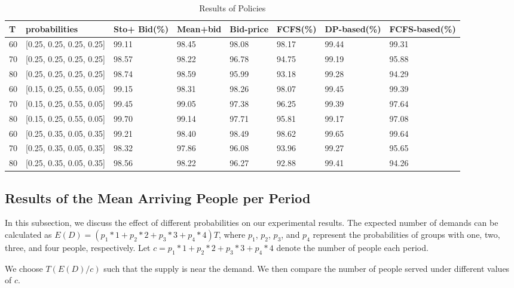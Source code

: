 \begin{table}[ht]
  \centering
  \caption{Results of Policies}
  \begin{tabular}{|l|l|l|l|l|l|l|l|}
  \hline
   T & probabilities &  Sto+ Bid(\%) & Mean+bid & Bid-price & FCFS(\%) & DP-based(\%) & FCFS-based(\%) \\
  \hline
   60  & [0.25, 0.25, 0.25, 0.25]  & 99.11 & 98.45 & 98.08 & 98.17 & 99.44 & 99.31 \\
   70  & [0.25, 0.25, 0.25, 0.25]  & 98.57 & 98.22 & 96.78 & 94.75 & 99.19 & 95.88 \\
   80  & [0.25, 0.25, 0.25, 0.25]  & 98.74 & 98.59 & 95.99 & 93.18 & 99.28 & 94.29 \\
   \hline
   60  & [0.15, 0.25, 0.55, 0.05]  & 99.15 & 98.31 & 98.26 & 98.07 & 99.45 & 99.39 \\
   70  & [0.15, 0.25, 0.55, 0.05]  & 99.45 & 99.05 & 97.38 & 96.25 & 99.39 & 97.64 \\
   80  & [0.15, 0.25, 0.55, 0.05]  & 99.70 & 99.14 & 97.71 & 95.81 & 99.17 & 97.08 \\
   \hline
   60  & [0.25, 0.35, 0.05, 0.35]  & 99.21 & 98.40 & 98.49 & 98.62 & 99.65 & 99.64 \\
   70  & [0.25, 0.35, 0.05, 0.35]  & 98.32 & 97.86 & 96.08 & 93.96 & 99.27 & 95.65 \\
   80  & [0.25, 0.35, 0.05, 0.35]  & 98.56 & 98.22 & 96.27 & 92.88 & 99.41 & 94.26 \\
  \hline
  \end{tabular}
\end{table}


\subsection{Results of the Mean Arriving People per Period}

In this subsection, we discuss the effect of different probabilities on our experimental results. The expected number of demands can be calculated as $E(D) = (p_1 * 1 + p_2 * 2 + p_3 * 3 + p_4 * 4) T$, where $p_1$, $p_2$, $p_3$, and $p_4$ represent the probabilities of groups with one, two, three, and four people, respectively. Let $c = p_1 * 1 + p_2 * 2 + p_3 * 3 + p_4 * 4$ denote the number of people each period.

We choose $T(E(D)/c)$ such that the supply is near the demand. We then compare the number of people served under different values of $c$.



